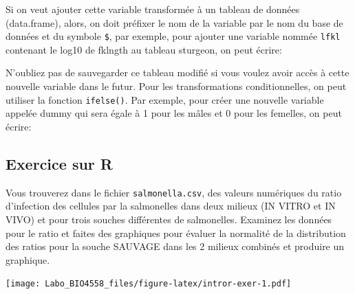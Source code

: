 \documentclass[12pt,]{book}
\newenvironment{Shaded}{\begin{snugshade}}{\end{snugshade}}
\newcommand{\DecValTok}[1]{\textcolor[rgb]{0.06,0.06,0.06}{#1}}
\newcommand{\KeywordTok}[1]{\textcolor[rgb]{0.27,0.27,0.27}{\textbf{#1}}}
\newcommand{\NormalTok}[1]{#1}
\newcommand{\OperatorTok}[1]{\textcolor[rgb]{0.43,0.43,0.43}{\textbf{#1}}}
\newcommand{\StringTok}[1]{\textcolor[rgb]{0.5,0.5,0.5}{#1}}
\begin{document}
Si on veut ajouter cette variable transformée à un tableau de données (data.frame), alors, on doit préfixer le nom de la variable par le nom du base de données et du symbole \texttt{\$}, par exemple, pour ajouter une variable nommée \texttt{lfkl} contenant le log10 de fklngth au tableau sturgeon, on peut écrire:

\begin{Shaded}
\end{Shaded}

N'oubliez pas de sauvegarder ce tableau modifié si vous voulez avoir accès à cette nouvelle variable dans le futur.
Pour les transformations conditionnelles, on peut utiliser la fonction \texttt{ifelse()}.
Par exemple, pour créer une nouvelle variable appelée dummy qui sera égale à 1 pour les mâles et 0 pour les femelles, on peut écrire:

\begin{Shaded}
\end{Shaded}

\hypertarget{exercice-sur-r}{%
\subsection{Exercice sur R}\label{exercice-sur-r}}

Vous trouverez dans le fichier \texttt{salmonella.csv}, des valeurs numériques du ratio d'infection des cellules par la salmonelles dans deux milieux (IN VITRO et IN VIVO) et pour trois souches différentes de salmonelles.
Examinez les données pour le ratio et faites des graphiques pour évaluer la normalité de la distribution des ratios pour la souche SAUVAGE dans les 2 milieux combinés et produire un graphique.

\texttt{[image: Labo\_BIO4558\_files/figure-latex/intror-exer-1.pdf]}

\iffalse
\end{document}
